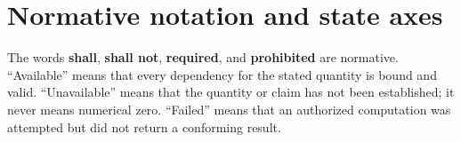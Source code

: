 \newcommand{\ContractVersion}{v0.1}
\newcommand{\DocumentRevision}{r0.3}
\newcommand{\MethodID}{\texttt{POINT-FIT/ELLIPTICAL-GAUSSIAN-COMPATIBILITY@1}}
\newcommand{\CompatMethod}{\texttt{POINT-COMPATIBILITY-METHOD v0.1}}
\newcommand{\FormalMethod}{\texttt{POINT-FORMAL-ERROR-METHOD v0.1}}
\newcommand{\RMSMethod}{\texttt{POINT-FULL-MAP-RMS-METHOD v0.1}}
\newcommand{\Unavailable}{\texttt{unavailable\_pending\_separate\_owner\_approval}}
\newcommand{\DecisionUnavailable}{\texttt{decision\_unavailable}}
\newcommand{\DeltaPoint}{\boldsymbol{\Delta}_{\mathrm{POINT}}}
\newcommand{\uvec}{\boldsymbol{u}}
\newcommand{\muhat}{\widehat{\boldsymbol{\mu}}}
\newcommand{\muexp}{\boldsymbol{\mu}_{\mathrm{expected}}}
\newcommand{\thetahat}{\widehat{\boldsymbol{\theta}}}
\newcommand{\Sigmashape}{\boldsymbol{\Sigma}_{g}}

\section{Normative notation and state axes}\label{sec:notation}

The words \textbf{shall}, \textbf{shall not}, \textbf{required}, and
\textbf{prohibited} are normative. ``Available'' means that every dependency
for the stated quantity is bound and valid. ``Unavailable'' means that the
quantity or claim has not been established; it never means numerical zero.
``Failed'' means that an authorized computation was attempted but did not
return a conforming result.

